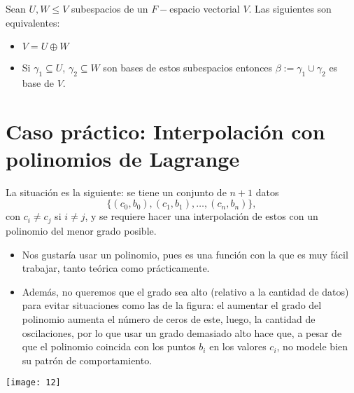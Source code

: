 \begin{prop}
Sean $U, W \leq V$ subespacios de un
$F-$espacio vectorial $V$. Las siguientes son equivalentes:
\begin{itemize}
	\item $V = U \oplus W$
	\item Si $\gamma_{1} \subseteq U$, $\gamma_{2} \subseteq W$ son
	bases de estos subespacios entonces 
	$\beta := \gamma_{1} \cup \gamma_{2}$ es base de $V$.
\end{itemize}
\end{prop}

\section{Caso práctico: Interpolación con polinomios de Lagrange}

La situación es la siguiente: se tiene un conjunto de $n+1$ datos
\[
\{ (c_{0}, b_{0}), (c_{1}, b_{1}), \ldots , (c_{n}, b_{n}) \},
\]
con $c_{i} \neq c_{j}$ si $i \neq j$, y se requiere
hacer una interpolación de estos con un polinomio
del menor grado posible. 
\begin{itemize}
	\item Nos gustaría usar un polinomio, pues es una función
	con la que es muy fácil trabajar, tanto teórica
	como prácticamente.
	\item Además, no queremos que el grado sea alto 
	(relativo a la cantidad de datos) para evitar situaciones
	como las de la figura: el aumentar el grado del polinomio
	aumenta el número de ceros de este, luego, la cantidad de
	oscilaciones, por lo que usar un grado demasiado alto hace
	que, a pesar de que el polinomio coincida con los puntos
	$b_{i}$ en los valores $c_{i}$, no modele bien su patrón
	de comportamiento.
\end{itemize}

\begin{marginfigure}
\texttt{[image: 12]} 
\end{marginfigure}

